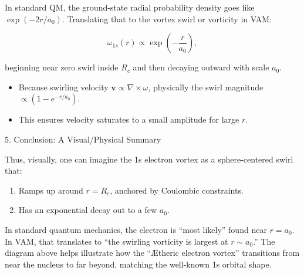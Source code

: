 In standard QM, the ground-state radial probability density goes like \(\exp(-2r/a_0)\). Translating that to the vortex swirl or vorticity in VAM:

\[
\omega_{1s}(r) \propto \exp\left(-\frac{r}{a_0}\right),
\]

beginning near zero swirl inside \(R_c\) and then decaying outward with scale \(a_0\).

\begin{itemize}
    \item Because swirling velocity \(\mathbf{v} \propto \nabla \times \omega\), physically the swirl magnitude \(\propto (1 - e^{-r/a_0})\).
    \item This ensures velocity saturates to a small amplitude for large \(r\).
\end{itemize}

5. Conclusion: A Visual/Physical Summary

Thus, visually, one can imagine the 1s electron vortex as a sphere-centered swirl that:

\begin{enumerate}
    \item Ramps up around \(r = R_c\), anchored by Coulombic constraints.
    \item Has an exponential decay out to a few \(a_0\).
\end{enumerate}

In standard quantum mechanics, the electron is “most likely” found near \(r = a_0\). In VAM, that translates to “the swirling vorticity is largest at \(r \sim a_0\).” The diagram above helps illustrate how the “Ætheric electron vortex” transitions from near the nucleus to far beyond, matching the well-known 1s orbital shape.